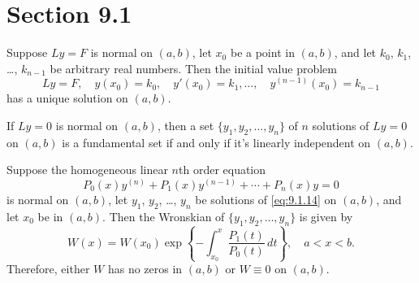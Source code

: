 \section*{Section 9.1}
{}
\setcounter{chapter}{9}
\setcounter{section}{1}

\setcounter{theorem}{0}
\begin{theorem}
  \label{thmtype:9.1.1} Suppose $Ly=F$ is normal on $(a,b)$, let $x_{0}$ be a point in $(a,b)$, and
  let $k_{0}$, $k_{1}$, \dots, $k_{n-1}$ be arbitrary real numbers. Then the initial value problem
  \[
    Ly=F,\quad y(x_{0})=k_{0},\quad y'(x_{0})=k_{1},\dots,\quad y^{(n-1)}(x_{0})=k_{n-1}
  \]
  has a unique solution on $(a,b)$.
\end{theorem}

\setcounter{theorem}{1}
\begin{theorem}
  \label{thmtype:9.1.2} If $Ly=0$ is normal on $(a,b)$, then a set $\{y_{1},y_{2},\dots,y_{n}\}$ of
  $n$ solutions of $Ly=0$ on $(a,b)$ is a fundamental set if and only if it's linearly independent
  on $(a,b)$.
\end{theorem}

\setcounter{theorem}{2}
\setcounter{equation}{13}
\begin{theorem}
  \label{thmtype:9.1.3} Suppose the homogeneous linear $n$th order equation
  \begin{equation}
    \label{eq:9.1.14}P_{0}(x)y^{(n)}+P_{1}(x)y^{(n-1)}+\cdots+P_{n}(x)y=0
  \end{equation}
  is normal on $(a,b)$, let $y_{1}$, $y_{2}$, \dots, $y_{n}$ be solutions of \eqref{eq:9.1.14} on
  $(a,b)$, and let $x_{0}$ be in $(a,b)$. Then the Wronskian of $\{y_{1},y_{2},\dots,y_{n}\}$ is
  given by
  \begin{equation}
    \label{eq:9.1.15}W(x)=W(x_{0})\exp\left\{-\int^{x}_{x_{0}}\frac{P_{1}(t)}{P_{0}(t)}\, dt\right\},\quad a<x<b.
  \end{equation}
  Therefore, either $W$ has no zeros in $(a,b)$ or $W\equiv0$ on $(a,b)$.
\end{theorem}

